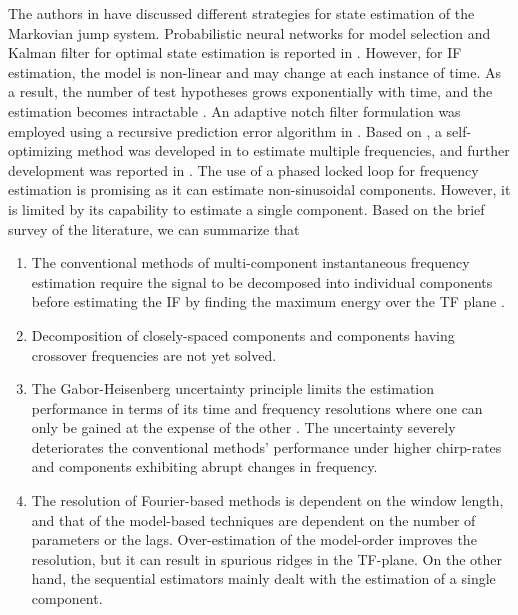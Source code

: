 The authors in \cite{ahn2019bayesian} have discussed different strategies for state estimation of the Markovian jump system. Probabilistic neural networks for model selection and Kalman filter for optimal state estimation is reported in \cite{shi2018switched}. However, for IF estimation, the model is non-linear and may change at each instance of time. As a result, the number of test hypotheses grows exponentially with time, and the estimation becomes intractable \cite{ahn2019bayesian}. An adaptive notch filter formulation was employed using a recursive prediction error algorithm in \cite{Tichavsky1995}. Based on \cite{Tichavsky1995}, a self-optimizing method was developed in \cite{Niedzwiecki2006a} to estimate multiple frequencies, and further development was reported in \cite{Niedzwiecki2011}. The use of a phased locked loop for frequency estimation \cite{Fedele2014} is promising as it can estimate non-sinusoidal components. However, it is limited by its capability to estimate a single component. Based on the brief survey of the literature, we can summarize that
\begin{enumerate}
	\renewcommand{\theenumi}{\roman{enumi}}
	\item  The conventional methods of multi-component instantaneous frequency estimation require the signal to be decomposed into individual components before estimating the IF by finding the maximum energy over the TF plane \cite{khan2013instantaneous}.
	
	\item Decomposition of closely-spaced components and components having crossover frequencies are not yet solved.
	
	\item The Gabor-Heisenberg uncertainty principle limits the estimation performance in terms of its time and frequency resolutions where one can only be gained at the expense of the other \cite{vetterli2014foundations}. The uncertainty severely deteriorates the conventional methods' performance under higher chirp-rates and components exhibiting abrupt changes in frequency.
	
	\item The resolution of Fourier-based methods is dependent on the window length, and that of the model-based techniques are dependent on the number of parameters or the lags. Over-estimation of the model-order improves the resolution, but it can result in spurious ridges in the TF-plane. On the other hand, the sequential estimators mainly dealt with the estimation of a single component.
\end{enumerate}
